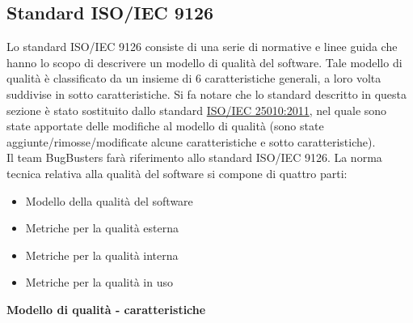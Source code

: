 \subsection{Standard ISO/IEC 9126}\label{AppQualitaProdotto}
Lo standard ISO/IEC 9126 consiste di una serie di normative e linee guida che hanno lo scopo di descrivere un modello di qualità del software. 
Tale modello di qualità è classificato da un insieme di 6 caratteristiche generali, a loro volta suddivise in sotto caratteristiche.
Si fa notare che lo standard descritto in questa sezione è stato sostituito dallo standard \href{http://www.iso.org/iso/iso_catalogue/catalogue_tc/catalogue_detail.htm?csnumber=35733}{ISO/IEC 25010:2011}, nel quale sono state apportate delle modifiche al modello di qualità (sono state aggiunte/rimosse/modificate alcune caratteristiche e sotto caratteristiche).\\
Il team BugBusters farà riferimento allo standard ISO/IEC 9126.
La norma tecnica relativa alla qualità del software si compone di quattro parti:
\begin{itemize}
\item Modello della qualità del software
\item Metriche per la qualità esterna
\item Metriche per la qualità interna
\item Metriche per la qualità in uso
\end{itemize}
\textbf{Modello di qualità - caratteristiche}
